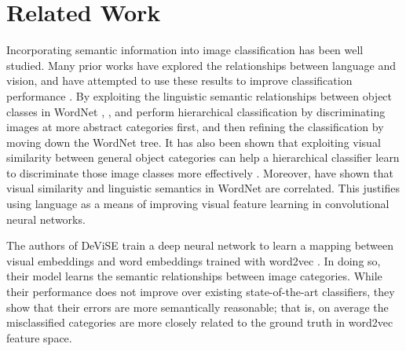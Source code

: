 \section{Related Work} \label{sec:related_works}


Incorporating semantic information into image classification has been well
studied. Many prior works have explored the relationships between language and
vision, and have attempted to use these results to improve classification
performance \cite{izadinia2015segment, frome2013devise}.
By exploiting the linguistic semantic relationships between object classes
in WordNet \cite{miller1995wordnet}, \cite{marszalek2007semantic}, and
\cite{grauman2011learning} perform hierarchical classification by
discriminating images at more abstract categories first, and then refining the
classification by moving down the WordNet tree.
It has also been shown that exploiting visual similarity between general object
categories can help a hierarchical classifier learn to discriminate those image
classes more effectively \cite{li2010building}.
Moreover, \cite{deselaers2011visual} have shown that visual similarity and
linguistic semantics in WordNet are correlated. This justifies using language
as a means of improving visual feature learning in convolutional neural
networks.


The authors of DeViSE \cite{frome2013devise} train a deep neural network to
learn a mapping between visual embeddings and word embeddings trained with
word2vec \cite{mikolov2013distributed}. In doing so, their model learns the
semantic relationships between image categories. While their performance does
not improve over existing state-of-the-art classifiers, they show that their
errors are more semantically reasonable; that is, on average the misclassified
categories are more closely related to the ground truth in word2vec feature
space.


